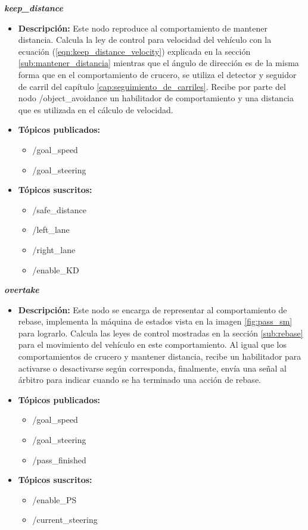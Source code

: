 \textbf{\textit{keep\_distance}}
\begin{itemize}
    \item \textbf{Descripción:} Este nodo reproduce al comportamiento de mantener distancia. Calcula la ley de control para velocidad del vehículo con la ecuación (\ref{eqn:keep_distance_velocity}) explicada en la sección \ref{sub:mantener_distancia} mientras que el ángulo de dirección es de la misma forma que en el comportamiento de crucero, se utiliza el detector y seguidor de carril del capítulo \ref{cap:seguimiento_de_carriles}. Recibe por parte del nodo /object\_avoidance un habilitador de comportamiento y una distancia que es utilizada en el cálculo de velocidad.
    \item \textbf{Tópicos publicados:}
    \begin{itemize}
        \item /goal\_speed
        \item /goal\_steering
    \end{itemize}
    \item \textbf{Tópicos suscritos:}
    \begin{itemize}
        \item /safe\_distance
        \item /left\_lane
        \item /right\_lane
        \item /enable\_KD
    \end{itemize}
\end{itemize}

\newpage

\textbf{\textit{overtake}}
\begin{itemize}
    \item \textbf{Descripción:} Este nodo se encarga de representar al comportamiento de rebase, implementa la máquina de estados vista en la imagen \ref{fig:pass_sm} para lograrlo. Calcula las leyes de control mostradas en la sección \ref{sub:rebase} para el movimiento del vehículo en este comportamiento. Al igual que los comportamientos de crucero y mantener distancia, recibe un habilitador para activarse o desactivarse según corresponda, finalmente, envía una señal al árbitro para indicar cuando se ha terminado una acción de rebase.
    \item \textbf{Tópicos publicados:}
    \begin{itemize}
        \item /goal\_speed
        \item /goal\_steering
        \item /pass\_finished
    \end{itemize}
    \item \textbf{Tópicos suscritos:}
    \begin{itemize}
        \item /enable\_PS
        \item /current\_steering
    \end{itemize}
\end{itemize}
\hfill

